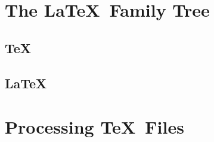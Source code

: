 \documentclass[hidelinks, float=false, crop=false]{standalone}
\begin{document}
    \section{The \LaTeX~Family Tree}
        \subsection{\TeX}
        \subsection{}
        \subsection{\LaTeX}
        \subsection{}
        \subsection{}

    \section{Processing \TeX~Files}
\end{document}
